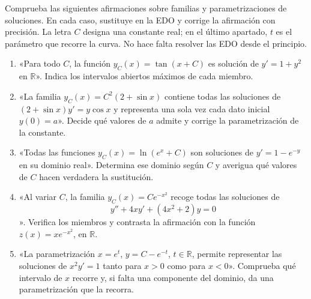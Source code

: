 Comprueba las siguientes afirmaciones sobre familias y parametrizaciones de soluciones. En cada caso, sustituye en la EDO y corrige la afirmación con precisión. La letra $C$ designa una constante real; en el último apartado, $t$ es el parámetro que recorre la curva. No hace falta resolver las EDO desde el principio.
\begin{enumerate}
\item «Para todo $C$, la función $y_C(x)=\tan(x+C)$ es solución de $y'=1+y^2$ en $\mathbb{R}$». Indica los intervalos abiertos máximos de cada miembro.
\item «La familia $y_C(x)=C^2(2+\sin x)$ contiene todas las soluciones de $(2+\sin x)y'=y\cos x$ y representa una sola vez cada dato inicial $y(0)=a$». Decide qué valores de $a$ admite y corrige la parametrización de la constante.
\item «Todas las funciones $y_C(x)=\ln(e^x+C)$ son soluciones de $y'=1-e^{-y}$ en su dominio real». Determina ese dominio según $C$ y averigua qué valores de $C$ hacen verdadera la sustitución.
\item «Al variar $C$, la familia $y_C(x)=Ce^{-x^2}$ recoge todas las soluciones de
\[
y''+4xy'+(4x^2+2)y=0
\]
». Verifica los miembros y contrasta la afirmación con la función $z(x)=xe^{-x^2}$, en $\mathbb{R}$.
\item «La parametrización $x=e^t$, $y=C-e^{-t}$, $t\in\mathbb{R}$, permite representar las soluciones de $x^2y'=1$ tanto para $x>0$ como para $x<0$». Comprueba qué intervalo de $x$ recorre y, si falta una componente del dominio, da una parametrización que la recorra.
\end{enumerate}
